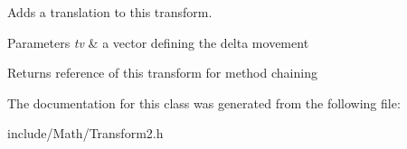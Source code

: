 Adds a translation to this transform.


\begin{DoxyParams}{Parameters}
{\em tv} & a vector defining the delta movement \\
\hline
\end{DoxyParams}
\begin{DoxyReturn}{Returns}
reference of this transform for method chaining 
\end{DoxyReturn}


The documentation for this class was generated from the following file\+:\begin{DoxyCompactItemize}
\item 
include/\+Math/Transform2.\+h\end{DoxyCompactItemize}
